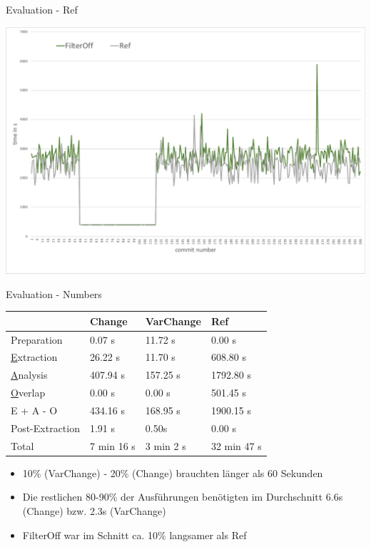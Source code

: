 \documentclass[aspectratio=43, noserifmath]{beamer}
\begin{document}
\begin{frame}{Evaluation - Ref}

\includegraphics[width=1\textwidth]{image/filteroff-vs-ref}

\end{frame}

\begin{frame}{Evaluation - Numbers}
\begin{tabular}{|l | l | l | l|}
\hline
                               & Change                 & VarChange          & Ref  \\ \hline
	Preparation                & 0.07 s                & 11.72 s             & 0.00 s \\
	\underline{E}xtraction     & 26.22 s                & 11.70 s            & 608.80 s \\
	\underline{A}nalysis       & 407.94 s               & 157.25 s           & 1792.80 s \\
	\underline{O}verlap        & 0.00 s                 & 0.00 s             & 501.45 s \\
	E + A - O                  & 434.16 s               & 168.95 s           & 1900.15 s \\
	Post-Extraction             & 1.91 s                 & 0.50s              & 0.00 s \\ \hline
	Total                      & 7 min 16 s             & 3 min 2 s          & 32 min 47 s \\ \hline
\end{tabular}

\begin{itemize}
    \item[\textbullet] 10\% (VarChange) - 20\% (Change) brauchten l\"anger als 60 Sekunden
    \item[\textbullet] Die restlichen 80-90\% der Ausf\"uhrungen ben\"otigten im Durchschnitt 6.6s (Change) bzw. 2.3s (VarChange)
    \item[\textbullet] FilterOff war im Schnitt ca. 10\% langsamer als Ref
\end{itemize}
\end{frame}
\end{document}
